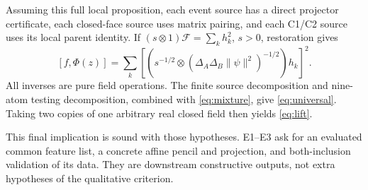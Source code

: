 Assuming this full local proposition, each event source has a direct
projector certificate, each closed-face source uses matrix pairing,
and each C1/C2 source uses its local parent identity.
If \((s\otimes1)\mathcal F=\sum_kh_k^2\), \(s>0\), restoration gives
\[
 [f,\Phi(z)]=
 \sum_k\left[
 \left(s^{-1/2}\otimes
       (\Delta_A\Delta_B\|\psi\|^2)^{-1/2}\right)h_k
 \right]^2.
\]
All inverses are pure field operations.
The finite source decomposition and nine-atom testing decomposition,
combined with \eqref{eq:mixture}, give \eqref{eq:universal}.
Taking two copies of one arbitrary real closed field then yields
\eqref{eq:lift}. 

This final implication is sound with those hypotheses.
E1--E3 ask for an evaluated common feature list, a concrete affine
pencil and projection, and both-inclusion validation of its data.
They are downstream constructive outputs, not extra hypotheses of
the qualitative criterion.

